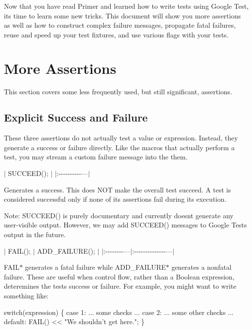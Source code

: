 Now that you have read Primer and learned how to write tests using Google Test, it\textquotesingle{}s time to learn some new tricks. This document will show you more assertions as well as how to construct complex failure messages, propagate fatal failures, reuse and speed up your test fixtures, and use various flags with your tests.

\section*{More Assertions}

This section covers some less frequently used, but still significant, assertions.

\subsection*{Explicit Success and Failure}

These three assertions do not actually test a value or expression. Instead, they generate a success or failure directly. Like the macros that actually perform a test, you may stream a custom failure message into the them.

$\vert$ {\ttfamily S\+U\+C\+C\+E\+E\+D();} $\vert$ $\vert$\+:-\/-\/-\/-\/-\/-\/-\/-\/-\/-\/---$\vert$

Generates a success. This does N\+OT make the overall test succeed. A test is considered successful only if none of its assertions fail during its execution.

Note\+: {\ttfamily S\+U\+C\+C\+E\+E\+D()} is purely documentary and currently doesn\textquotesingle{}t generate any user-\/visible output. However, we may add {\ttfamily S\+U\+C\+C\+E\+E\+D()} messages to Google Test\textquotesingle{}s output in the future.

$\vert$ {\ttfamily F\+A\+I\+L();} $\vert$ {\ttfamily A\+D\+D\+\_\+\+F\+A\+I\+L\+U\+R\+E();} $\vert$ $\vert$\+:-\/-\/-\/-\/-\/-\/-\/-\/---$\vert$\+:-\/-\/-\/-\/-\/-\/-\/-\/-\/-\/-\/-\/-\/-\/---$\vert$

{\ttfamily F\+A\+I\+L$\ast$} generates a fatal failure while {\ttfamily A\+D\+D\+\_\+\+F\+A\+I\+L\+U\+R\+E$\ast$} generates a nonfatal failure. These are useful when control flow, rather than a Boolean expression, deteremines the test\textquotesingle{}s success or failure. For example, you might want to write something like\+:


\begin{DoxyCode}
switch(expression) \{
  case 1: ... some checks ...
  case 2: ... some other checks
  ...
  default: FAIL() << "We shouldn't get here.";
\}
\end{DoxyCode}


